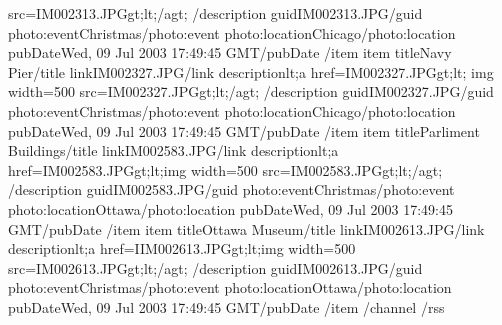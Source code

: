 \documentclass[letterpaper,12pt,english,openany,oneside]{sphinxmanual}
\begin{document}
\begin{sphinxVerbatim}[commandchars=\\\{\}]
               src=\PYGZdq{}IM002313.JPG\PYGZdq{}\PYGZam{}gt;\PYGZam{}lt;/a\PYGZam{}gt;
           \PYGZlt{}/description\PYGZgt{}
           \PYGZlt{}guid\PYGZgt{}IM002313.JPG\PYGZlt{}/guid\PYGZgt{}
           \PYGZlt{}photo:event\PYGZgt{}Christmas\PYGZlt{}/photo:event\PYGZgt{}
           \PYGZlt{}photo:location\PYGZgt{}Chicago\PYGZlt{}/photo:location\PYGZgt{}
           \PYGZlt{}pubDate\PYGZgt{}Wed, 09 Jul 2003 17:49:45 GMT\PYGZlt{}/pubDate\PYGZgt{}
       \PYGZlt{}/item\PYGZgt{}
       \PYGZlt{}item\PYGZgt{}
           \PYGZlt{}title\PYGZgt{}Navy Pier\PYGZlt{}/title\PYGZgt{}
           \PYGZlt{}link\PYGZgt{}IM002327.JPG\PYGZlt{}/link\PYGZgt{}
           \PYGZlt{}description\PYGZgt{}\PYGZam{}lt;a href=\PYGZdq{}IM002327.JPG\PYGZdq{}\PYGZam{}gt;\PYGZam{}lt;
               img width=500 src=\PYGZdq{}IM002327.JPG\PYGZdq{}\PYGZam{}gt;\PYGZam{}lt;/a\PYGZam{}gt;
           \PYGZlt{}/description\PYGZgt{}
           \PYGZlt{}guid\PYGZgt{}IM002327.JPG\PYGZlt{}/guid\PYGZgt{}
           \PYGZlt{}photo:event\PYGZgt{}Christmas\PYGZlt{}/photo:event\PYGZgt{}
           \PYGZlt{}photo:location\PYGZgt{}Chicago\PYGZlt{}/photo:location\PYGZgt{}
           \PYGZlt{}pubDate\PYGZgt{}Wed, 09 Jul 2003 17:49:45 GMT\PYGZlt{}/pubDate\PYGZgt{}
       \PYGZlt{}/item\PYGZgt{}
       \PYGZlt{}item\PYGZgt{}
           \PYGZlt{}title\PYGZgt{}Parliment Buildings\PYGZlt{}/title\PYGZgt{}
           \PYGZlt{}link\PYGZgt{}IM002583.JPG\PYGZlt{}/link\PYGZgt{}
           \PYGZlt{}description\PYGZgt{}\PYGZam{}lt;a href=\PYGZdq{}IM002583.JPG\PYGZdq{}\PYGZam{}gt;\PYGZam{}lt;img width=500
               src=\PYGZdq{}IM002583.JPG\PYGZdq{}\PYGZam{}gt;\PYGZam{}lt;/a\PYGZam{}gt;
           \PYGZlt{}/description\PYGZgt{}
           \PYGZlt{}guid\PYGZgt{}IM002583.JPG\PYGZlt{}/guid\PYGZgt{}
           \PYGZlt{}photo:event\PYGZgt{}Christmas\PYGZlt{}/photo:event\PYGZgt{}
           \PYGZlt{}photo:location\PYGZgt{}Ottawa\PYGZlt{}/photo:location\PYGZgt{}
           \PYGZlt{}pubDate\PYGZgt{}Wed, 09 Jul 2003 17:49:45 GMT\PYGZlt{}/pubDate\PYGZgt{}
       \PYGZlt{}/item\PYGZgt{}
       \PYGZlt{}item\PYGZgt{}
           \PYGZlt{}title\PYGZgt{}Ottawa Museum\PYGZlt{}/title\PYGZgt{}
           \PYGZlt{}link\PYGZgt{}IM002613.JPG\PYGZlt{}/link\PYGZgt{}
           \PYGZlt{}description\PYGZgt{}\PYGZam{}lt;a href=\PYGZdq{}IIM002613.JPG\PYGZdq{}\PYGZam{}gt;\PYGZam{}lt;img width=500
               src=\PYGZdq{}IM002613.JPG\PYGZdq{}\PYGZam{}gt;\PYGZam{}lt;/a\PYGZam{}gt;
           \PYGZlt{}/description\PYGZgt{}
           \PYGZlt{}guid\PYGZgt{}IM002613.JPG\PYGZlt{}/guid\PYGZgt{}
           \PYGZlt{}photo:event\PYGZgt{}Christmas\PYGZlt{}/photo:event\PYGZgt{}
           \PYGZlt{}photo:location\PYGZgt{}Ottawa\PYGZlt{}/photo:location\PYGZgt{}
           \PYGZlt{}pubDate\PYGZgt{}Wed, 09 Jul 2003 17:49:45 GMT\PYGZlt{}/pubDate\PYGZgt{}
       \PYGZlt{}/item\PYGZgt{}
   \PYGZlt{}/channel\PYGZgt{}
\PYGZlt{}/rss\PYGZgt{}


\end{sphinxVerbatim}
\end{document}
